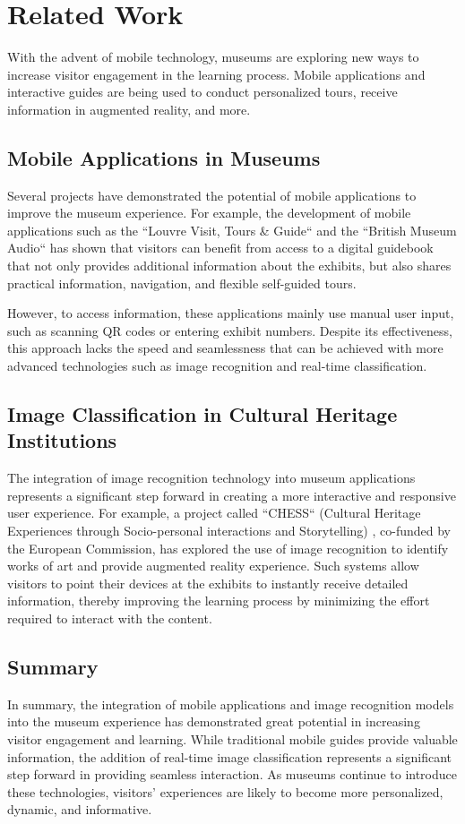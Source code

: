 \chapter{Related Work}

With the advent of mobile technology, museums are exploring new ways to increase visitor engagement in the learning process. Mobile applications and interactive guides are being used to conduct personalized tours, receive information in augmented reality, and more.

\section*{Mobile Applications in Museums}

Several projects have demonstrated the potential of mobile applications to improve the museum experience. For example, the development of mobile applications such as the ``Louvre Visit, Tours \& Guide`` \cite{louvre_app} and the ``British Museum Audio`` \cite{british_museum_app} has shown that visitors can benefit from access to a digital guidebook that not only provides additional information about the exhibits, but also shares practical information, navigation, and flexible self-guided tours.

However, to access information, these applications mainly use manual user input, such as scanning QR codes or entering exhibit numbers. Despite its effectiveness, this approach lacks the speed and seamlessness that can be achieved with more advanced technologies such as image recognition and real-time classification.

\section*{Image Classification in Cultural Heritage Institutions}

The integration of image recognition technology into museum applications represents a significant step forward in creating a more interactive and responsive user experience. For example, a project called ``CHESS`` (Cultural Heritage Experiences through Socio-personal interactions and Storytelling) \cite{chess_project}, co-funded by the European Commission, has explored the use of image recognition to identify works of art and provide augmented reality experience. Such systems allow visitors to point their devices at the exhibits to instantly receive detailed information, thereby improving the learning process by minimizing the effort required to interact with the content.

\section*{Summary}

In summary, the integration of mobile applications and image recognition models into the museum experience has demonstrated great potential in increasing visitor engagement and learning. While traditional mobile guides provide valuable information, the addition of real-time image classification represents a significant step forward in providing seamless interaction. As museums continue to introduce these technologies, visitors' experiences are likely to become more personalized, dynamic, and informative.